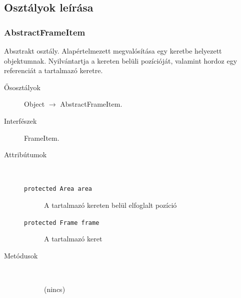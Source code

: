 	\subsection{Osztályok leírása}
	
		\subsubsection{AbstractFrameItem} Absztrakt osztály.
				 Alapértelmezett megvalósítása egy keretbe helyezett objektumnak.   Nyilvántartja a kereten belüli pozícióját, valamint hordoz  egy referenciát a tartalmazó keretre. 			\begin{description}


				\item[Ősosztályok] Object $\rightarrow{}$ AbstractFrameItem.
				\item[Interfészek] FrameItem.
				\item[Attribútumok]$\ $
					\begin{description}
						\item[\texttt{protected Area area}] A tartalmazó kereten belül elfoglalt pozíció 
						\item[\texttt{protected Frame frame}] A tartalmazó keret 
					\end{description}
				\item[Metódusok]$\ $
					\begin{description}
						\item[] (nincs)
					\end{description}
			\end{description}

